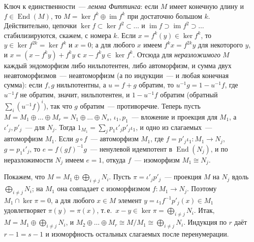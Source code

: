 \begin{aside}
Ключ к единственности~--- \emph{лемма Фиттинга}: если $M$ имеет конечную длину и $f\in\operatorname{End}(M)$, то
$M=\ker f^k\oplus\operatorname{im}f^k$ при достаточно большом $k$. Действительно, цепочки $\ker f\subset\ker f^2\subset\dots$
и $\operatorname{im}f\supset\operatorname{im}f^2\supset\dots$ стабилизируются, скажем, с номера $k$. Если
$x=f^k(y)\in\ker f^k$, то $y\in\ker f^{2k}=\ker f^k$ и $x=0$; а для любого $x$ имеем $f^kx=f^{2k}y$ для некоторого $y$,
и $x=(x-f^ky)+f^ky$ с $x-f^ky\in\ker f^k$. Отсюда для \emph{неразложимого} $M$ каждый эндоморфизм либо нильпотентен, либо
автоморфизм, и сумма двух неавтоморфизмов~--- неавтоморфизм (а по индукции~--- и любая конечная сумма): если $f,g$
нильпотентны, а $u=f+g$ обратим, то
$u^{-1}g=1-u^{-1}f$, где $u^{-1}f$ не обратим, значит, нильпотентен, и $1-u^{-1}f$ обратим (обратный
$\sum_i(u^{-1}f)^i$), так что $g$ обратим~--- противоречие. Теперь пусть $M=M_1\oplus\dots\oplus M_r=N_1\oplus\dots\oplus N_s$,
$\iota_1,p_1$~--- вложение и проекция для $M_1$, а $\iota'_j,p'_j$~--- для $N_j$. Тогда $1_{M_1}=\sum_jp_1\iota'_jp'_j\iota_1$,
и одно из слагаемых~--- автоморфизм $M_1$. Если $g\circ f$~--- автоморфизм $M_1$, где $f=p'_j\iota_1\colon M_1\to N_j$,
$g=p_1\iota'_j$, то $e=f(gf)^{-1}g$~--- ненулевой идемпотент в $\operatorname{End}(N_j)$, и по неразложимости $N_j$ имеем
$e=1$, откуда $f$~--- изоморфизм $M_1\cong N_j$.

Покажем, что $M=M_1\oplus\bigoplus_{i\ne j}N_i$. Пусть $\pi=\iota'_jp'_j$~--- проекция $M$ на $N_j$ вдоль
$\bigoplus_{i\ne j}N_i$; на $M_1$ она совпадает с изоморфизмом $f\colon M_1\to N_j$. Поэтому $M_1\cap\ker\pi=0$, а для
любого $x\in M$ элемент $y=\iota_1f^{-1}p'_j(x)\in M_1$ удовлетворяет $\pi(y)=\pi(x)$, т.\,е.\
$x-y\in\ker\pi=\bigoplus_{i\ne j}N_i$. Итак, $M=M_1\oplus\bigoplus_{i\ne j}N_i$, и
$M_2\oplus\dots\oplus M_r\cong M/M_1\cong\bigoplus_{i\ne j}N_i$. Индукция по $r$ даёт $r-1=s-1$ и изоморфность остальных
слагаемых после перенумерации.
\end{aside}
